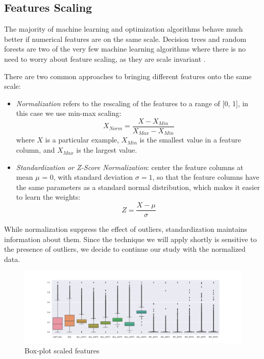 \documentclass{article}
\begin{document}
\subsection{Features Scaling}

The majority of machine learning and optimization algorithms behave much better if numerical features are on the same scale. Decision trees and random forests are two of the very few machine learning algorithms where there is no need to worry about feature scaling, as they are scale invariant \cite{quattro}.

There are two common approaches to bringing different features onto the same scale: 
\begin{itemize}
    \item \emph{Normalization} refers to the rescaling of the features to a range of [0, 1], in this case we use min-max scaling:
    \begin{equation}
    X_{Norm} = \frac{X - X_{Min}}{X_{Max} - X_{Min}}
    \end{equation}
    where $X$ is a particular example, $X_{Min}$ is the smallest value in a feature column, and $X_{Max}$ is the largest value.
    
    \item \emph{Standardization or Z-Score Normalization}: center the feature columns at mean $\mu$ = 0,  with standard deviation $\sigma = 1$, so that the feature columns have the same parameters as a standard normal distribution, which makes it easier to learn the weights: 
    \begin{equation}
    Z = \frac{X - \mu }{\sigma }
    \end{equation}
\end{itemize}

While normalization suppress the effect of outliers, standardization maintains information about them. Since the technique we will apply shortly is sensitive to the presence of outliers, we decide to continue our study with the normalized data.

\begin{figure}[h]
\centering
\includegraphics[width=1\textwidth]{scalingfeature.png}
\caption{Box-plot scaled features}
\end{figure}
\end{document}
